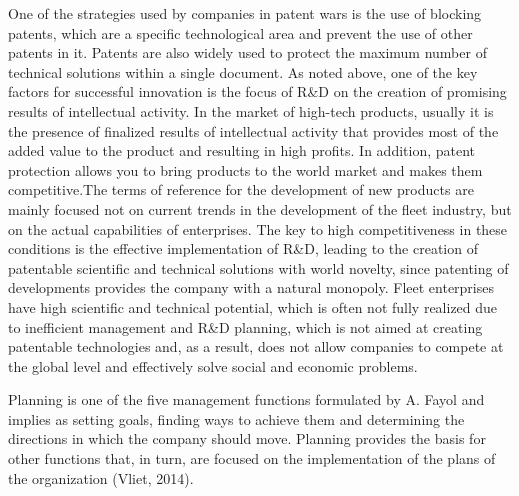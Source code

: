 \documentclass[12pt,twoside]{reedthesis}
\begin{document}
One of the strategies used by companies in patent wars is the use of blocking patents, which are a specific technological area and prevent the use of other patents in it. Patents are also widely used to protect the maximum number of technical solutions within a single document. As noted above, one of the key factors for successful innovation is the focus of R\&D on the creation of promising results of intellectual activity. In the market of high-tech products, usually it is the presence of finalized results of intellectual activity that provides most of the added value to the product and resulting in high profits. In addition, patent protection allows you to bring products to the world market and makes them competitive.The terms of reference for the development of new products are mainly focused not on current trends in the development of the fleet industry, but on the actual capabilities of enterprises. The key to high competitiveness in these conditions is the effective implementation of R\&D, leading to the creation of patentable scientific and technical solutions with world novelty, since patenting of developments provides the company with a natural monopoly. Fleet enterprises have high scientific and technical potential, which is often not fully realized due to inefficient management and R\&D planning, which is not aimed at creating patentable technologies and, as a result, does not allow companies to compete at the global level and effectively solve social and economic problems.

Planning is one of the five management functions formulated by A. Fayol and implies as setting goals, finding ways to achieve them and determining the directions in which the company should move. Planning provides the basis for other functions that, in turn, are focused on the implementation of the plans of the organization (Vliet, 2014).
\end{document}
